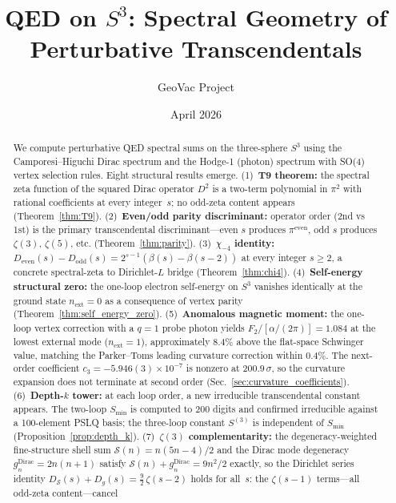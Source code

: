 \documentclass[11pt]{article}
\title{QED on $S^3$: Spectral Geometry of Perturbative Transcendentals}
\author{GeoVac Project}
\date{April 2026}
\begin{document}
\maketitle

\begin{abstract}
We compute perturbative QED spectral sums on the three-sphere $S^3$
using the Camporesi--Higuchi Dirac spectrum and the Hodge-1 (photon)
spectrum with SO(4) vertex selection rules.  Eight structural results
emerge.
(1)~\textbf{T9 theorem:} the spectral zeta function of the squared
Dirac operator $D^2$ is a two-term polynomial in $\pi^2$ with rational
coefficients at every integer~$s$; no odd-zeta content appears
(Theorem~\ref{thm:T9}).
(2)~\textbf{Even/odd parity discriminant:} operator order (2nd vs 1st)
is the primary transcendental discriminant---even $s$ produces
$\pi^{\mathrm{even}}$, odd $s$ produces $\zeta(3)$, $\zeta(5)$, etc.
(Theorem~\ref{thm:parity}).
(3)~\textbf{$\chi_{-4}$ identity:}
$D_{\mathrm{even}}(s) - D_{\mathrm{odd}}(s) = 2^{s-1}(\beta(s) -
\beta(s{-}2))$ at every integer $s \ge 2$, a concrete spectral-zeta
to Dirichlet-$L$ bridge (Theorem~\ref{thm:chi4}).
(4)~\textbf{Self-energy structural zero:} the one-loop electron
self-energy on $S^3$ vanishes identically at the ground state
$n_{\mathrm{ext}}=0$ as a consequence of vertex parity
(Theorem~\ref{thm:self_energy_zero}).
(5)~\textbf{Anomalous magnetic moment:} the one-loop vertex correction
with a $q=1$ probe photon yields $F_2 / [\alpha/(2\pi)] = 1.084$ at the
lowest external mode ($n_{\mathrm{ext}}=1$), approximately 8.4\% above
the flat-space Schwinger value, matching the Parker--Toms leading
curvature correction within 0.4\%.  The next-order coefficient
$c_3 = -5.946(3) \times 10^{-7}$ is nonzero at $200.9\,\sigma$, so the
curvature expansion does not terminate at second order
(Sec.~\ref{sec:curvature_coefficients}).
(6)~\textbf{Depth-$k$ tower:} at each loop order, a new irreducible
transcendental constant appears.  The two-loop $S_{\min}$ is computed
to 200 digits and confirmed irreducible against a 100-element PSLQ
basis; the three-loop constant $S^{(3)}$ is independent of $S_{\min}$
(Proposition~\ref{prop:depth_k}).
(7)~\textbf{$\zeta(3)$ complementarity:} the degeneracy-weighted
fine-structure shell sum $\mathcal{S}(n) = n(5n-4)/2$ and the Dirac
mode degeneracy $g_n^{\mathrm{Dirac}} = 2n(n+1)$ satisfy
$\mathcal{S}(n) + g_n^{\mathrm{Dirac}} = 9n^2/2$ exactly, so the
Dirichlet series identity
$D_{\mathcal{S}}(s) + D_{g}(s) = \tfrac{9}{2}\,\zeta(s{-}2)$ holds
for all~$s$: the $\zeta(s{-}1)$ terms---all odd-zeta content---cancel

\end{abstract}
\end{document}
